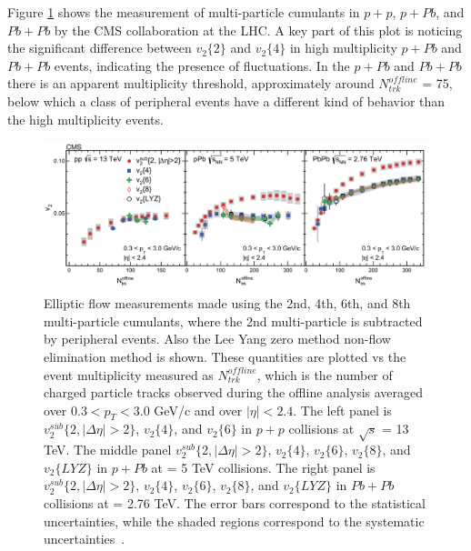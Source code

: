 Figure \ref{fig:pp_pPb_PbPb_cumulants} shows the measurement of multi-particle cumulants in $p+p$, $p+Pb$, and $Pb+Pb$ by the CMS collaboration at the LHC. A key part of this plot is noticing the significant difference between $v_2\{2\}$ and $v_2\{4\}$ in high multiplicity $p+Pb$ and $Pb+Pb$ events, indicating the presence of fluctuations. In the $p+Pb$ and $Pb+Pb$ there is an apparent multiplicity threshold, approximately around $N^{offline}_{trk}$ = 75, below which a class of peripheral events have a different kind of behavior than the high multiplicity events. 
\begin{figure}[!ht]
\begin{center}
\includegraphics[width=0.95\linewidth]{figs/pp_pPb_PbPb_cumulants.PNG}
\caption{Elliptic flow measurements made using the 2nd, 4th, 6th, and 8th multi-particle cumulants, where the 2nd multi-particle is subtracted by peripheral events. Also the Lee Yang zero method non-flow elimination method is shown. These quantities are plotted vs the event multiplicity measured as $N^{offline}_{trk}$, which is the number of charged particle tracks observed during the offline analysis averaged over  $0.3 < p_T < 3.0$ GeV/c and over $|\eta| < 2.4$. The left panel is $v^{sub}_2\{2,|\Delta\eta|> 2\}$, $v_2\{4\}$, and $v_2\{6\}$ in $p+p$ collisions at $\sqrt{s}$ = 13 TeV. The middle panel $v^{sub}_2\{2,|\Delta\eta|> 2\}$, $v_2\{4\}$, $v_2\{6\}$, $v_2\{8\}$, and $v_2\{LYZ\}$ in $p+Pb$ at \sqsn = 5 TeV collisions. The right panel is  $v^{sub}_2\{2,|\Delta\eta|> 2\}$, $v_2\{4\}$, $v_2\{6\}$, $v_2\{8\}$, and $v_2\{LYZ\}$ in $Pb+Pb$ collisions at \sqsn = 2.76 TeV. The error bars correspond to the statistical uncertainties, while the shaded regions correspond to the systematic uncertainties~\cite{Khachatryan2017193}.}
\label{fig:pp_pPb_PbPb_cumulants}
\end{center}
\end{figure}

